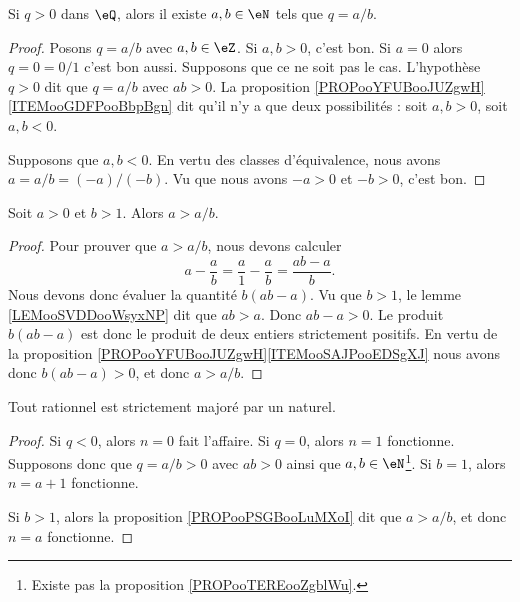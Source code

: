 \begin{proposition}	\label{PROPooTEREooZgblWu}
	Si \( q>0\) dans \( \eQ\), alors il existe \( a,b\in \eN\) tels que \( q=a/b\).
\end{proposition}

\begin{proof}
	Posons \( q=a/b\) avec \( a,b\in \eZ\). Si \( a,b>0\), c'est bon. Si \( a=0\) alors \( q=0=0/1\) c'est bon aussi. Supposons que ce ne soit pas le cas. L'hypothèse \( q>0\) dit que \( q=a/b\) avec \( ab>0\). La proposition \ref{PROPooYFUBooJUZgwH}\ref{ITEMooGDFPooBbpBgn} dit qu'il n'y a que deux possibilités : soit \( a,b>0\), soit \( a,b<0\).

	Supposons que \( a,b<0\). En vertu des classes d'équivalence, nous avons \( a=a/b=(-a)/(-b)\). Vu que nous avons \( -a>0\) et \( -b>0\), c'est bon.
\end{proof}

\begin{proposition}	\label{PROPooPSGBooLuMXoI}
	Soit \( a>0\) et \( b>1\). Alors \( a>a/b\).
\end{proposition}

\begin{proof}
	Pour prouver que \( a>a/b\), nous devons calculer
	\begin{equation}
		a-\frac{ a }{ b }=\frac{ a }{ 1 }-\frac{ a }{ b }=\frac{ ab-a }{ b }.
	\end{equation}
	Nous devons donc évaluer la quantité \( b(ab-a)\). Vu que \( b>1\), le lemme \ref{LEMooSVDDooWsyxNP} dit que \( ab>a\). Donc \( ab-a>0\). Le produit \( b(ab-a)\) est donc le produit de deux entiers strictement positifs. En vertu de la proposition \ref{PROPooYFUBooJUZgwH}\ref{ITEMooSAJPooEDSgXJ} nous avons donc \( b(ab-a)>0\), et donc \( a>a/b\).
\end{proof}

\begin{lemma} \label{LEMooEBTIooGMoHsj}
	Tout rationnel est strictement majoré par un naturel.
\end{lemma}

\begin{proof}
	Si \( q<0\), alors \( n=0\) fait l'affaire. Si \( q=0\), alors \( n=1\) fonctionne. Supposons donc que \( q=a/b>0\) avec \( ab>0\) ainsi que \( a,b\in \eN\)\footnote{Existe pas la proposition \ref{PROPooTEREooZgblWu}.}. Si \( b=1\), alors \( n=a+1\) fonctionne.

	Si \( b>1\), alors la proposition \ref{PROPooPSGBooLuMXoI} dit que \( a>a/b\), et donc \( n=a\) fonctionne.
\end{proof}

